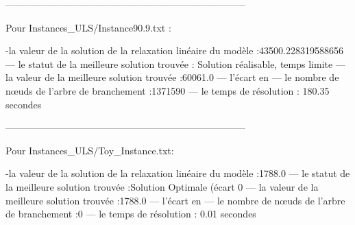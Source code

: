 ---------------------------------------------------------------------------

Pour Instances_ULS/Instance90.9.txt :


-la valeur de la solution de la relaxation linéaire du modèle :43500.228319588656
— le statut de la meilleure solution trouvée : Solution réalisable, temps limite 
— la valeur de la meilleure solution trouvée :60061.0
— l’écart en %
— le nombre de nœuds de l’arbre de branchement :1371590
— le temps de résolution : 180.35 secondes


---------------------------------------------------------------------------

Pour Instances_ULS/Toy_Instance.txt:


-la valeur de la solution de la relaxation linéaire du modèle :1788.0
— le statut de la meilleure solution trouvée :Solution Optimale (écart 0%
— la valeur de la meilleure solution trouvée :1788.0
— l’écart en %
— le nombre de nœuds de l’arbre de branchement :0
— le temps de résolution : 0.01 secondes